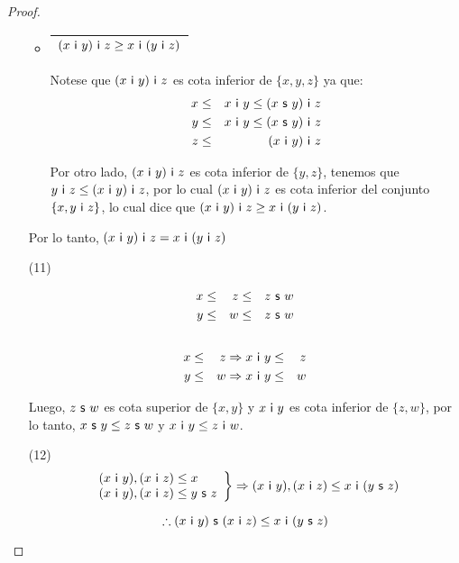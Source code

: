 \begin{proof}
\begin{enumerate}
\begin{itemize}
          \item \begin{tabular}{|c|} \hline $(x \ \IN \ y) \ \IN \ z \geq x \ \IN \ (y \ \IN \ z)$\\\hline \end{tabular}
            \PN Notese que $(x \ \IN \ y) \ \IN \ z$ es cota inferior de $\{x, y, z\}$ ya que:
            \begin{eqnarray*}
              x &\leq& x \ \mathsf{i} \ y \leq (x \ \mathsf{s} \ y) \ \mathsf{i} \ z \\
              y &\leq& x \ \mathsf{i} \ y \leq (x \ \mathsf{s} \ y) \ \mathsf{i} \ z \\
              z &\leq& (x \ \mathsf{i} \ y) \ \mathsf{i} \ z
            \end{eqnarray*}

            \PN Por otro lado, $(x \ \IN \ y) \ \IN \ z$ es cota inferior de $\{y, z\}$, tenemos que $y \ \mathsf{i} \ z \leq
            (x \ \mathsf{i} \ y) \ \mathsf{i} \ z$, por lo cual $(x \ \IN \ y) \ \IN \ z$ es cota inferior del conjunto $\{x, y \ \mathsf{i}
            \ z\}$, lo cual dice que $(x \ \IN \ y) \ \IN \ z \geq x \ \IN \ (y \ \IN \ z)$.
        \end{itemize}

        \PN Por lo tanto, $(x \ \mathsf{i} \ y) \ \mathsf{i} \ z = x \ \mathsf{i} \ (y \ \mathsf{i} \ z)$

      \item[(11)]
        \begin{multicols}{2}
          \begin{alignat*}{3}
            x &\leq& z &\leq& z \ \SU \ w \\
            y &\leq& w &\leq& z \ \SU \ w \\
          \end{alignat*}
          \begin{alignat*}{3}
            \\
            x &\leq& z \Rightarrow x \ \IN \ y &\leq& z \\
            y &\leq& w \Rightarrow x \ \IN \ y &\leq& w
          \end{alignat*}
        \end{multicols}
        \PN Luego, $z \ \mathsf{s} \ w$ es cota superior de $\{x, y\}$ y $x \ \mathsf{i} \ y$ es cota inferior de $\{z, w\}$, por lo
        tanto, $x \ \SU \ y \leq z \ \SU \ w$ y $x \ \IN \ y \leq z \ \IN \ w$.

      \item[(12)]
        \begin{equation*}
          \left.
          \begin{array}{l}
            (x \ \mathsf{i} \ y), (x \ \mathsf{i} \ z) \leq x \\
            (x \ \mathsf{i} \ y), (x \ \mathsf{i} \ z) \leq y \ \mathsf{s} \ z
          \end{array}
          \right \rbrace \Rightarrow (x \ \mathsf{i} \ y), (x \ \mathsf{i} \ z) \leq x \ \mathsf{i} \ (y \ \mathsf{s} \ z)
        \end{equation*}

        \[
          \therefore (x \ \IN \ y) \ \SU \ (x \ \IN \ z) \leq x \ \IN \ (y \ \SU \ z)
        \]
    \end{enumerate}
  \end{proof}

